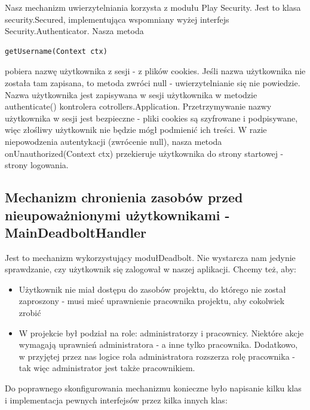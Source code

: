 \documentclass[a4paper,12pt,notitlepage]{mwrep}
\begin{document}
Nasz mechanizm uwierzytelniania korzysta z modułu Play Security. Jest to klasa security.Secured, implementująca wspomniany wyżej interfejs Security.Authenticator. Nasza metoda \begin{verbatim}getUsername(Context ctx)\end{verbatim} pobiera nazwę użytkownika z sesji - z plików cookies. Jeśli nazwa użytkownika nie została tam zapisana, to metoda zwróci null - uwierzytelnianie się nie powiedzie. Nazwa użytkownika jest zapisywana w sesji użytkownika w metodzie authenticate() kontrolera cotrollers.Application. Przetrzymywanie nazwy użytkownika w sesji jest bezpieczne - pliki cookies są szyfrowane i podpisywane, więc złośliwy użytkownik nie będzie mógł podmienić ich treści. W razie niepowodzenia autentykacji (zwrócenie null), nasza metoda onUnauthorized(Context ctx) przekieruje użytkownika do strony startowej - strony logowania.

\subsection{Mechanizm chronienia zasobów przed nieupoważnionymi użytkownikami - MainDeadboltHandler}

Jest to mechanizm wykorzystujący modułDeadbolt. Nie wystarcza nam jedynie sprawdzanie, czy użytkownik się zalogował w naszej aplikacji. Chcemy też, aby:
\begin{itemize}
	\item	Użytkownik nie miał dostępu do zasobów projektu, do którego nie został zaproszony - musi mieć uprawnienie pracownika projektu, aby cokolwiek zrobić
	\item	W projekcie był podział na role: administratorzy i pracownicy. Niektóre akcje wymagają uprawnień administratora - a inne tylko pracownika. Dodatkowo, w przyjętej przez nas logice rola administratora rozszerza rolę pracownika - tak więc administrator jest także pracownikiem.
\end{itemize}
Do poprawnego skonfigurowania mechanizmu konieczne było napisanie kilku klas i implementacja pewnych interfejsów przez kilka innych klas:
\end{document}

